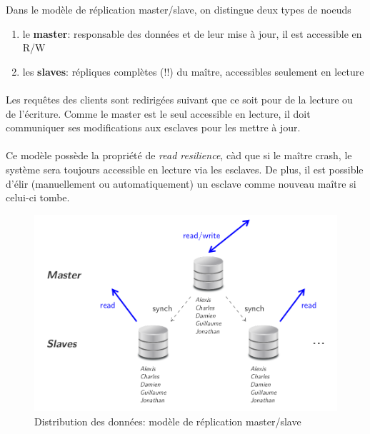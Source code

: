 \item{}
{\vrai}
{Dans le modèle de réplication master/slave, on distingue deux types de noeuds
\begin{enumerate}
\item le \textbf{master}: responsable des données et de leur mise à jour, il est accessible en R/W
\item les \textbf{slaves}: répliques complètes (!!) du maître, accessibles seulement en lecture
\end{enumerate}

\paragraph{}
Les requêtes des clients sont redirigées suivant que ce soit pour de la lecture ou de l'écriture. Comme le master est le seul accessible en lecture, il doit communiquer ses modifications aux esclaves pour les mettre à jour.

\paragraph{}
Ce modèle possède la propriété de \textit{read resilience}, càd que si le maître crash, le système sera toujours accessible en lecture via les esclaves. De plus, il est possible d'élir (manuellement ou automatiquement) un esclave comme nouveau maître si celui-ci tombe.

\begin{figure}[!h]
\center\includegraphics[scale=.3]{images/replication-masterslave}
\caption{Distribution des données: modèle de réplication master/slave \cite{ref1}}
\end{figure}

}
